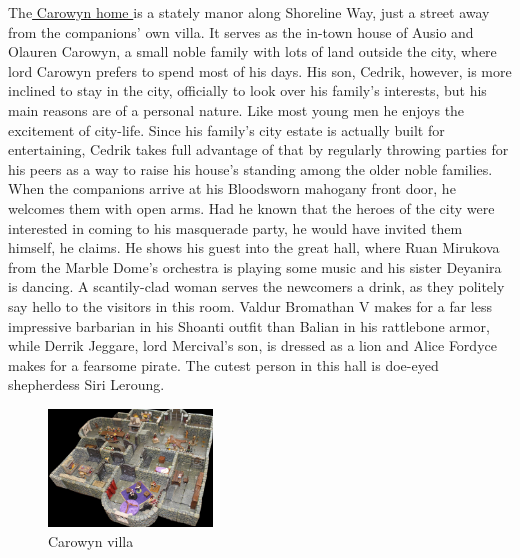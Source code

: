 The\hyperref[fig:Carowyn-villa-486295633]{ Carowyn home } is a stately manor along Shoreline Way, just a street away from the companions' own villa. It serves as the in-town house of Ausio and Olauren Carowyn, a small noble family with lots of land outside the city, where lord Carowyn prefers to spend most of his days. His son, Cedrik, however, is more inclined to stay in the city, officially to look over his family's interests, but his main reasons are of a personal nature. Like most young men he enjoys the excitement of city-life. Since his family's city estate is actually built for entertaining, Cedrik takes full advantage of that by regularly throwing parties for his peers as a way to raise his house's standing among the older noble families. When the companions arrive at his Bloodsworn mahogany front door, he welcomes them with open arms. Had he known that the heroes of the city were interested in coming to his masquerade party, he would have invited them himself, he claims. He shows his guest into the great hall, where Ruan Mirukova from the Marble Dome's orchestra is playing some music and his sister Deyanira is dancing. A scantily-clad woman serves the newcomers a drink, as they politely say hello to the visitors in this room. Valdur Bromathan V makes for a far less impressive barbarian in his Shoanti outfit than Balian in his rattlebone armor, while Derrik Jeggare, lord Mercival's son, is dressed as a lion and Alice Fordyce makes for a fearsome pirate. The cutest person in this hall is doe-eyed shepherdess Siri Leroung. \\

\begin{figure}[h]
	\centering
	\includegraphics[width=0.39\textwidth]{images/Carowyn-villa-486295633.jpg}
	\caption{Carowyn villa}
	\label{fig:Carowyn-villa-486295633}
\end{figure}

